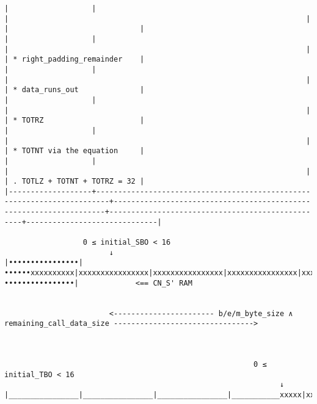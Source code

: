 \documentclass[varwidth=\maxdimen,margin=0.5cm,multi={verbatim}]{standalone}
\begin{document}
\begin{verbatim}
|                   |                                                                         |                                                                    |                                                  |                              |
|                   |                                                                         |                                                                    |                                                  | * right_padding_remainder    |
|                   |                                                                         |                                                                    |                                                  | * data_runs_out              |
|                   |                                                                         |                                                                    |                                                  | * TOTRZ                      |
|                   |                                                                         |                                                                    |                                                  | * TOTNT via the equation     |
|                   |                                                                         |                                                                    |                                                  | . TOTLZ + TOTNT + TOTRZ = 32 |
|-------------------+-------------------------------------------------------------------------+--------------------------------------------------------------------+--------------------------------------------------+------------------------------|

                  0 ≤ initial_SBO < 16
                        ↓
|••••••••••••••••|••••••xxxxxxxxxx|xxxxxxxxxxxxxxxx|xxxxxxxxxxxxxxxx|xxxxxxxxxxxxxxxx|xxxxxx•••••••••|••••••••••••••••|             <== CN_S' RAM


                        <----------------------- b/e/m_byte_size ∧ remaining_call_data_size -------------------------------->



                                                         0 ≤ initial_TBO < 16
                                                               ↓
|________________|________________|________________|___________xxxxx|xxxxxxxxxxxxxxxx|xxxxxxxxxxxxxxxx|xxxxxxxxxxxxxxxx|xxxxxxxxxxx_____|________________|________________|________________|
                                                                                                                                                                                              

\end{verbatim}
\end{document}
